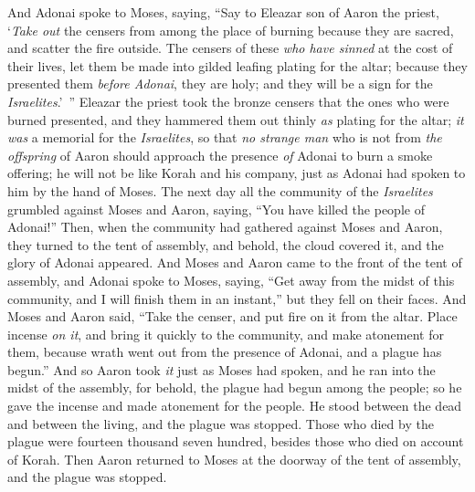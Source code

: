 \begin{biblechapter}
\verse  And Adonai spoke to Moses, saying,
\verse “Say to Eleazar son of Aaron the priest, ‘\textit{Take out} the censers from among the place of burning because they are sacred, and scatter the fire outside.
\verse The censers of these \textit{who have sinned} at the cost of their lives, let them be made into gilded leafing plating for the altar; because they presented them \textit{before Adonai}, they are holy; and they will be a sign for the \textit{Israelites}.’ ”
\verse Eleazar the priest took the bronze censers that the ones who were burned presented, and they hammered them out thinly \textit{as} plating for the altar;
\verse \textit{it was} a memorial for the \textit{Israelites}, so that \textit{no strange man} who is not from \textit{the offspring} of Aaron should approach the presence \textit{of} Adonai to burn a smoke offering; he will not be like Korah and his company, just as Adonai had spoken to him by the hand of Moses.
 The next day all the community of the \textit{Israelites} grumbled against Moses and Aaron, saying, “You have killed the people of Adonai!”
\verse Then, when the community had gathered against Moses and Aaron, they turned to the tent of assembly, and behold, the cloud covered it, and the glory of Adonai appeared.
\verse And Moses and Aaron came to the front of the tent of assembly,
\verse and Adonai spoke to Moses, saying,
\verse “Get away from the midst of this community, and I will finish them in an instant,” but they fell on their faces.
\verse And Moses and Aaron said, “Take the censer, and put fire on it from the altar. Place incense \textit{on it}, and bring it quickly to the community, and make atonement for them, because wrath went out from the presence of Adonai, and a plague has begun.”
\verse And so Aaron took \textit{it} just as Moses had spoken, and he ran into the midst of the assembly, for behold, the plague had begun among the people; so he gave the incense and made atonement for the people.
\verse He stood between the dead and between the living, and the plague was stopped.
\verse Those who died by the plague were fourteen thousand seven hundred, besides those who died on account of Korah.
\verse Then Aaron returned to Moses at the doorway of the tent of assembly, and the plague was stopped.
\end{biblechapter}


